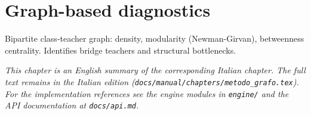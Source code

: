 \chapter{Graph-based diagnostics}
\label{ch:metodo_grafo_en}

Bipartite class-teacher graph: density, modularity (Newman-Girvan), betweenness centrality. Identifies bridge teachers and structural bottlenecks.

\medskip
\noindent
\textit{This chapter is an English summary of the corresponding Italian chapter. The full text remains in the Italian edition (\texttt{docs/manual/chapters/metodo\_grafo.tex}). For the implementation references see the engine modules in \texttt{engine/} and the API documentation at \texttt{docs/api.md}.}
